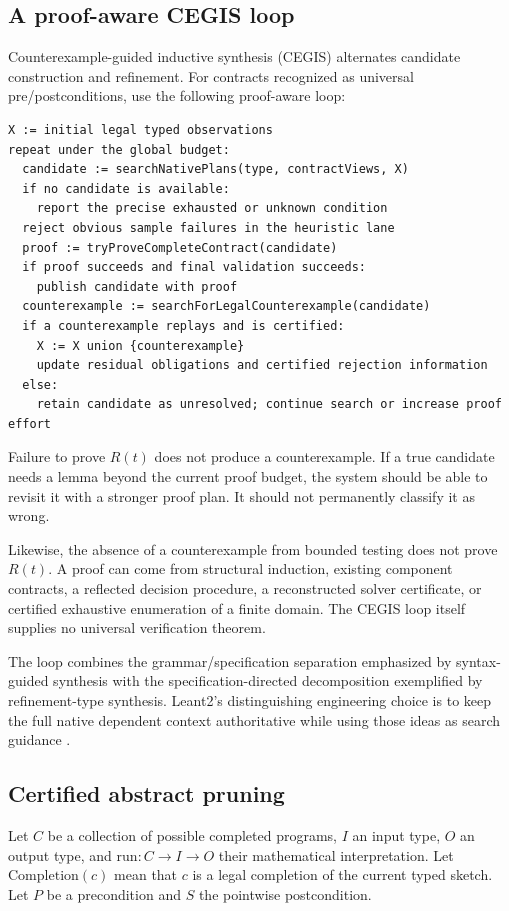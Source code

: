 \documentclass[11pt,a4paper]{article}
\theoremstyle{remark}
\begin{document}
\subsection{A proof-aware CEGIS loop}

Counterexample-guided inductive synthesis (CEGIS) alternates candidate construction and refinement. For contracts recognized as universal pre/postconditions, use the following proof-aware loop:
\begin{lstlisting}
X := initial legal typed observations
repeat under the global budget:
  candidate := searchNativePlans(type, contractViews, X)
  if no candidate is available:
    report the precise exhausted or unknown condition
  reject obvious sample failures in the heuristic lane
  proof := tryProveCompleteContract(candidate)
  if proof succeeds and final validation succeeds:
    publish candidate with proof
  counterexample := searchForLegalCounterexample(candidate)
  if a counterexample replays and is certified:
    X := X union {counterexample}
    update residual obligations and certified rejection information
  else:
    retain candidate as unresolved; continue search or increase proof effort
\end{lstlisting}

Failure to prove $R(t)$ does not produce a counterexample. If a true candidate needs a lemma beyond the current proof budget, the system should be able to revisit it with a stronger proof plan. It should not permanently classify it as wrong.

Likewise, the absence of a counterexample from bounded testing does not prove $R(t)$. A proof can come from structural induction, existing component contracts, a reflected decision procedure, a reconstructed solver certificate, or certified exhaustive enumeration of a finite domain. The CEGIS loop itself supplies no universal verification theorem.

The loop combines the grammar/specification separation emphasized by syntax-guided synthesis with the specification-directed decomposition exemplified by refinement-type synthesis. Leant2's distinguishing engineering choice is to keep the full native dependent context authoritative while using those ideas as search guidance \cite{sygus,synquid}.

\subsection{Certified abstract pruning}

Let $C$ be a collection of possible completed programs, $I$ an input type, $O$ an output type, and $\mathrm{run}:C\to I\to O$ their mathematical interpretation. Let $\mathrm{Completion}(c)$ mean that $c$ is a legal completion of the current typed sketch. Let $P$ be a precondition and $S$ the pointwise postcondition.
\end{document}
